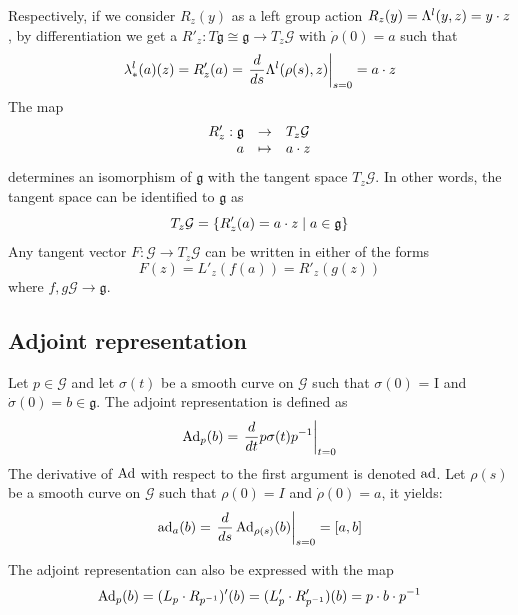 Respectively, if we consider $R_z(y)$ as a left group action $ R_z(y) = \Lambda^l( y, z) =y \cdot z $, by differentiation we get a $R'_z : T \mathfrak g \cong  \mathfrak g \rightarrow T_z\mathcal G$ with $\dot\rho (0)=a$ such that
\begin{equation}
  \label{eq:150}
  \lambda^l_{*}(a)(z) = R'_z(a) = \left.\frac{d}{ds}{ \Lambda^l (\rho(s),z)}\right|_{s=0} = a \cdot z
\end{equation}
The map
\begin{equation}
  \label{eq:152}
  \begin{array}{rcl}
  R'_z  : \mathfrak g &\rightarrow& T_z\mathcal G  \\
         a &\mapsto&  a \cdot z
  \end{array}
\end{equation}
determines an isomorphism of $\mathfrak g$ with the tangent space  $T_z\mathcal G$. In other words, the  tangent space can be identified to $\mathfrak g$ as
\begin{equation}
  \label{eq:153}
  T_z\mathcal G =\{R'_z(a) = a \cdot z \mid a \in \mathfrak g  \}
\end{equation}
Any tangent vector $F : \mathcal G \rightarrow T_z\mathcal G$ can be written in either of the forms
\begin{equation}
  \label{eq:155}
  F(z) = L'_z(f(a)) = R'_z(g(z))
\end{equation}
where $f,g \mathcal G \rightarrow \mathfrak g$.
\subsection{Adjoint representation}
\begin{definition}
Let $p \in \mathcal G$ and let $\sigma (t)$ be a smooth curve on $\mathcal G$ such that $\sigma (0)$ = I and $\dot \sigma(0) = b \in \mathfrak g$. The adjoint representation is defined as
\begin{equation}
\operatorname{Ad}_p(b) =\left. \frac{d}{dt} p\sigma(t)p^{-1}\right|_{t=0}\label{eq:40}
\end{equation}
The derivative of $\operatorname{Ad}$ with respect to the first argument is denoted $\operatorname{ad}$. Let $\rho(s)$ be a smooth curve on $\mathcal G$ such that $\rho(0) = I$  and $\dot \rho(0) = a$, it  yields:
\begin{equation}
  \label{eq:41}
    \operatorname{ad}_a(b) = \left.\frac{d}{ds} \operatorname{Ad}_{\rho(s)}(b)\right|_{s=0}  = [a, b]
\end{equation}
\end{definition}
The adjoint representation can also be expressed with the map
\begin{equation}
  \label{eq:154}
  \operatorname{Ad}_p(b)  = (L_p \cdot R_{p^{-1}})' (b) = (L'_p \cdot R'_{p^{-1}}) (b) = p \cdot b \cdot p^{-1}
\end{equation}

